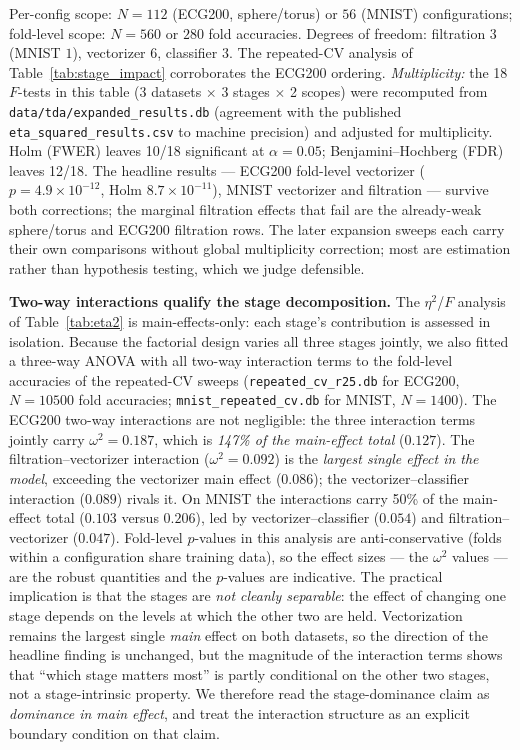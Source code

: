 \documentclass[12pt, a4paper]{report}
\theoremstyle{definition}
\theoremstyle{plain}
\theoremstyle{remark}
\begin{document}
\begin{table}[H]
  \vspace{0.2cm}
  \footnotesize{Per-config scope: $N = 112$ (ECG200, sphere/torus) or
    $56$ (MNIST) configurations; fold-level scope: $N = 560$ or $280$
    fold accuracies. Degrees of freedom: filtration $3$ (MNIST $1$),
    vectorizer $6$, classifier $3$. The repeated-CV analysis of
    Table~\ref{tab:stage_impact} corroborates the ECG200 ordering.
    \emph{Multiplicity:} the 18 $F$-tests in this table (3 datasets
    $\times$ 3 stages $\times$ 2 scopes) were recomputed from
    \texttt{data/tda/expanded\_results.db} (agreement with the published
    \texttt{eta\_squared\_results.csv} to machine precision) and adjusted for
    multiplicity. Holm (FWER) leaves 10/18 significant at
    $\alpha{=}0.05$; Benjamini--Hochberg (FDR) leaves 12/18. The
    headline results --- ECG200 fold-level vectorizer
    ($p = 4.9\times10^{-12}$, Holm $8.7\times10^{-11}$), MNIST
    vectorizer and filtration --- survive both corrections; the
    marginal filtration effects that fail are the already-weak
    sphere/torus and ECG200 filtration rows. The later expansion
sweeps each carry their own comparisons without global multiplicity
correction; most are estimation rather than hypothesis testing, which
we judge defensible.}
\end{table}

\textbf{Two-way interactions qualify the stage decomposition.} The
$\eta^2$/$F$ analysis of Table~\ref{tab:eta2} is main-effects-only:
each stage's contribution is assessed in isolation. Because the
factorial design varies all three stages jointly, we also fitted a
three-way ANOVA with all two-way interaction terms to the fold-level
accuracies of the repeated-CV sweeps (\texttt{repeated\_cv\_r25.db}
for ECG200, $N{=}10500$ fold accuracies; \texttt{mnist\_repeated\_cv.db}
for MNIST, $N{=}1400$). The ECG200 two-way interactions are not
negligible: the three interaction terms jointly carry
$\omega^2 = 0.187$, which is \emph{147\% of the main-effect total}
($0.127$). The filtration--vectorizer interaction ($\omega^2 = 0.092$)
is the \emph{largest single effect in the model}, exceeding the
vectorizer main effect ($0.086$); the vectorizer--classifier
interaction ($0.089$) rivals it. On MNIST the interactions carry 50\%
of the main-effect total ($0.103$ versus $0.206$), led by
vectorizer--classifier ($0.054$) and filtration--vectorizer
($0.047$). Fold-level $p$-values in this analysis are
anti-conservative (folds within a configuration share training data),
so the effect sizes --- the $\omega^2$ values --- are the robust
quantities and the $p$-values are indicative. The practical
implication is that the stages are \emph{not cleanly separable}: the
effect of changing one stage depends on the levels at which the other
two are held. Vectorization remains the largest single \emph{main}
effect on both datasets, so the direction of the headline finding is
unchanged, but the magnitude of the interaction terms shows that
``which stage matters most'' is partly conditional on the other two
stages, not a stage-intrinsic property. We therefore read the
stage-dominance claim as \emph{dominance in main effect}, and treat
the interaction structure as an explicit boundary condition on that
claim.
\end{document}
